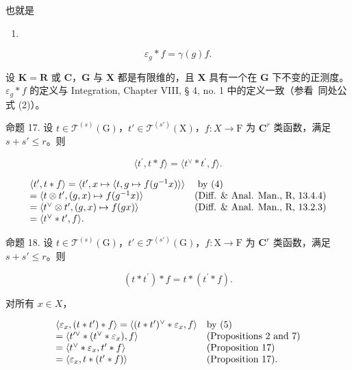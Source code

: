 也就是

\begin{enumerate}
\def\labelenumi{(\arabic{enumi})}
\setcounter{enumi}{6}
\tightlist
\item
\end{enumerate}

\[
\varepsilon_ {g} * f = \gamma (g) f.
\]

设 \(\mathbf{K} = \mathbf{R}\) 或 \(\mathbf{C}\)，\(\mathbf{G}\) 与 \(\mathbf{X}\) 都是有限维的，且 \(\mathbf{X}\) 具有一个在 \(\mathbf{G}\) 下不变的正测度。\(\varepsilon_g * f\) 的定义与 Integration, Chapter VIII, § 4, no. 1 中的定义一致（参看~同处公式 (2)）。

命题 17. 设 \(t \in \mathcal{T}^{(s)}(\mathrm{G})\)，\(t' \in \mathcal{T}^{(s')}(\mathrm{X})\)，\(f: X \to \mathrm{F}\) 为 \(\mathbf{C}^{r}\) 类函数，满足 \(s + s' \leqslant r\)。则

\[
\langle t ^ {\prime}, t * f \rangle = \langle t ^ {\vee} * t ^ {\prime}, f \rangle .
\]

\[
\begin{array}{l l} \langle t ^ {\prime}, t * f \rangle = \langle t ^ {\prime}, x \mapsto \langle t, g \mapsto f (g ^ {- 1} x) \rangle \rangle & \text { by   (4) } \\ = \langle t \otimes t ^ {\prime}, (g, x) \mapsto f (g ^ {- 1} x) \rangle & \text {(Diff. \& Anal. Man., R, 13.4.4)} \\ = \langle t ^ {\vee} \otimes t ^ {\prime}, (g, x) \mapsto f (g x) \rangle & \text {(Diff. \& Anal. Man., R, 13.2.3)} \\ = \langle t ^ {\vee} * t ^ {\prime}, f \rangle . \end{array}
\]

命题 18. 设 \(t \in \mathcal{T}^{(s)}(\mathrm{G})\)，\(t' \in \mathcal{T}^{(s')}(\mathrm{G})\)，\(f: \mathrm{X} \to \mathrm{F}\) 为 \(\mathbf{C}^r\) 类函数，满足 \(s + s' \leqslant r\)。则

\[
(t * t ^ {\prime}) * f = t * (t ^ {\prime} * f).
\]

对所有 \(x \in X\)，

\[
\begin{array}{l l} \langle \varepsilon_ {x}, (t * t ^ {\prime}) * f \rangle = \langle (t * t ^ {\prime}) ^ {\vee} * \varepsilon_ {x}, f \rangle & \text {by (5)} \\ = \langle t ^ {\prime \vee} * (t ^ {\vee} * \varepsilon_ {x}), f \rangle & \text {(Propositions 2 and 7)} \\ = \langle t ^ {\vee} * \varepsilon_ {x}, t ^ {\prime} * f \rangle & \text {(Proposition 17)} \\ = \langle \varepsilon_ {x}, t * (t ^ {\prime} * f) \rangle & \text {(Proposition 17).} \end{array}
\]

